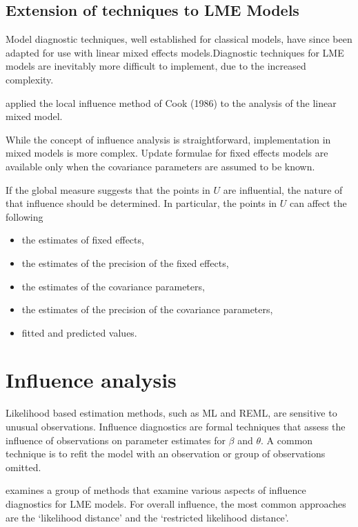 \documentclass[12pt, a4paper]{article}
\begin{document}
\subsection{Extension of techniques to LME Models} %


Model diagnostic techniques, well established for classical models, have since been adapted for use with linear mixed effects models.Diagnostic techniques for LME models are inevitably more difficult to implement, due to the increased complexity.


\citet{Beckman} applied the local influence method of Cook (1986) to the analysis of the linear mixed model.


While the concept of influence analysis is straightforward, implementation in mixed models is more complex. Update formulae for fixed effects models are available only when the covariance parameters are assumed to be known.


If the global measure suggests that the points in $U$ are influential, the nature of that influence should be determined. In particular, the points in $U$ can affect the following


\begin{itemize}
	\item the estimates of fixed effects,
	\item the estimates of the precision of the fixed effects,
	\item the estimates of the covariance parameters,
	\item the estimates of the precision of the covariance parameters,
	\item fitted and predicted values.
\end{itemize}





\section{Influence analysis} %

Likelihood based estimation methods, such as ML and REML, are sensitive to unusual observations. Influence diagnostics are formal techniques that assess the influence of observations on parameter estimates for $\beta$ and $\theta$. A common technique is to refit the model with an observation or group of observations omitted.

\citet{west} examines a group of methods that examine various aspects of influence diagnostics for LME models.
For overall influence, the most common approaches are the `likelihood distance' and the `restricted likelihood distance'.
\end{document}
